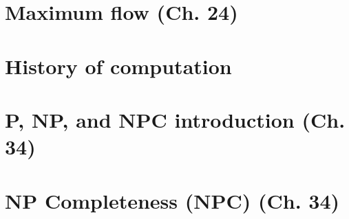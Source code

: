 \documentclass{article}
\begin{document}

\section{Maximum flow (Ch. 24)}

\newpage


\section{History of computation}

\newpage


\section{P, NP, and NPC introduction (Ch. 34)}

\newpage

\section{NP Completeness (NPC) (Ch. 34)} 


\end{document}
